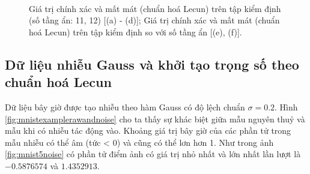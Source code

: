 \begin{figure}[ht!]
\begin{center}
{        }\\
%
    \end{center}
    \caption{%
        Giá trị chính xác và mất mát (chuẩn hoá Lecun) trên tập kiểm định (số tầng ẩn: 11, 12) [(a) - (d)]; Giá trị chính xác và mất mát (chuẩn hoá Lecun) trên tập kiểm định so với số tầng ẩn [(e), (f)].
     }%
   \label{fig:mnistd4}
\end{figure}

\clearpage

\subsection{Dữ liệu nhiễu Gauss và khởi tạo trọng số theo chuẩn hoá Lecun}\label{subsec:mnistnoise}

Dữ liệu bây giờ được tạo nhiễu theo hàm Gauss có độ lệch chuẩn $\sigma = 0.2$.
Hình \ref{fig:mnistexamplerawandnoise} cho ta thấy sự khác biệt giữa mẫu nguyên thuỷ và mẫu khi có nhiễu tác động vào.
Khoảng giá trị bây giờ của các phần tử trong mẫu nhiễu có thể âm (tức < 0) và cũng có thể lơn hơn 1.
Như trong ảnh \ref{fig:mnist5noise} có phần tử điểm ảnh có giá trị nhỏ nhất và lớn nhất lần lượt là $-0.5876574$ và $1.4352913$.

